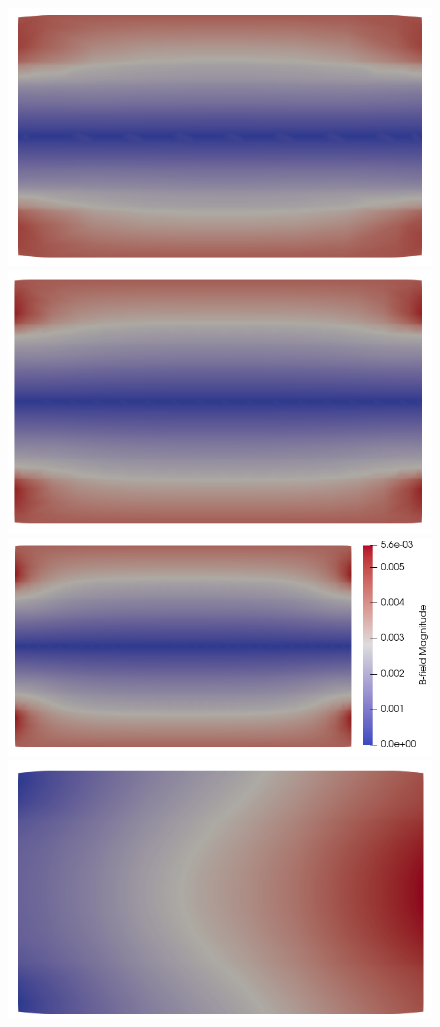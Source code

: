 \documentclass{report}
\begin{document}
\begin{figure}
    \includegraphics[scale=0.27]{slice_B_T-1_lambda-0_8-2-2.png}
    \includegraphics[scale=0.27]{slice_B_T-1_lambda-0_16-3-3.png}
    \includegraphics[scale=0.27]{slice_B_T-1_lambda-0_32-3-4.png}
    \includegraphics[scale=0.27]{slice_ne_T-1_lambda-0_8-2-2.png}

\end{figure}
\end{document}
